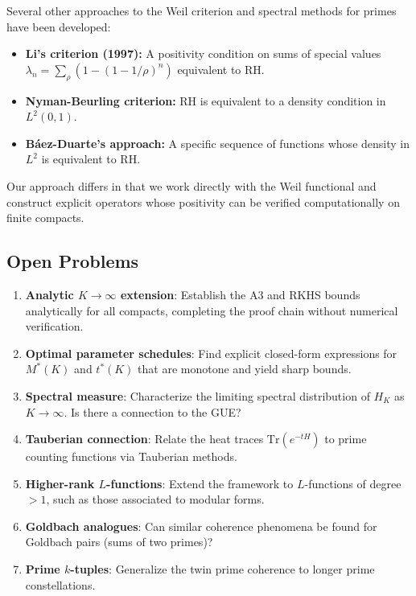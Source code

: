 Several other approaches to the Weil criterion and spectral methods for primes have been developed:

\begin{itemize}
  \item \textbf{Li's criterion (1997):} A positivity condition on sums of special values $\lambda_n = \sum_\rho (1 - (1 - 1/\rho)^n)$ equivalent to RH.

  \item \textbf{Nyman-Beurling criterion:} RH is equivalent to a density condition in $L^2(0, 1)$.

  \item \textbf{B\'aez-Duarte's approach:} A specific sequence of functions whose density in $L^2$ is equivalent to RH.
\end{itemize}

Our approach differs in that we work directly with the Weil functional and construct explicit operators whose positivity can be verified computationally on finite compacts.

\subsection{Open Problems}

\begin{enumerate}
  \item \textbf{Analytic $K \to \infty$ extension}: Establish the A3 and RKHS bounds analytically for all compacts, completing the proof chain without numerical verification.

  \item \textbf{Optimal parameter schedules}: Find explicit closed-form expressions for $M^*(K)$ and $t^*(K)$ that are monotone and yield sharp bounds.

  \item \textbf{Spectral measure}: Characterize the limiting spectral distribution of $H_K$ as $K \to \infty$. Is there a connection to the GUE?

  \item \textbf{Tauberian connection}: Relate the heat traces $\mathrm{Tr}(e^{-tH})$ to prime counting functions via Tauberian methods.

  \item \textbf{Higher-rank $L$-functions}: Extend the framework to $L$-functions of degree $> 1$, such as those associated to modular forms.

  \item \textbf{Goldbach analogues}: Can similar coherence phenomena be found for Goldbach pairs (sums of two primes)?

  \item \textbf{Prime $k$-tuples}: Generalize the twin prime coherence to longer prime constellations.
\end{enumerate}

